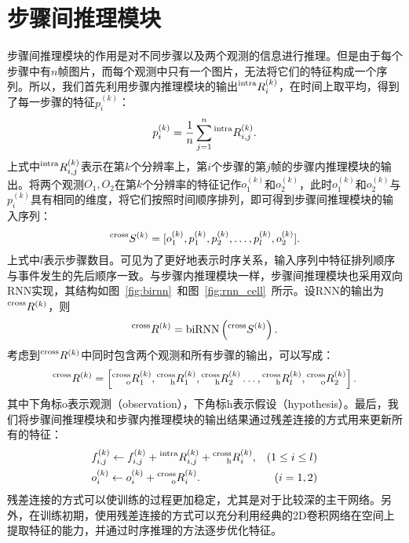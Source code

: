 \section{步骤间推理模块}\label{sec:CSR}
步骤间推理模块的作用是对不同步骤以及两个观测的信息进行推理。但是由于每个步骤中有$n$帧图片，而每个观测中只有一个图片，无法将它们的特征构成一个序列。所以，我们首先利用步骤内推理模块的输出$\prescript{\mathrm{intra}}{}{R}^{(k)}_i$，在时间上取平均，得到了每一步骤的特征$p_i^{(k)}$：
\begin{equation}
    p_i^{(k)} = \frac{1}{n}\sum_{j=1}^n\prescript{\mathrm{intra}}{}{R}^{(k)}_{i,j}.
\end{equation}
上式中$\prescript{\mathrm{intra}}{}{R}^{(k)}_{i,j}$表示在第$k$个分辨率上，第$i$个步骤的第$j$帧的步骤内推理模块的输出。将两个观测$O_1,O_2$在第$k$个分辨率的特征记作$o_1^{(k)}$和$o_2^{(k)}$，此时$o_1^{(k)}$和$o_2^{(k)}$与$p_i^{(k)}$具有相同的维度，将它们按照时间顺序排列，即可得到步骤间推理模块的输入序列：
\begin{equation}
    \prescript{\mathrm{cross}}{}{S}^{(k)} = [o_1^{(k)}, p_1^{(k)}, p_2^{(k)}, \ldots, p_l^{(k)}, o_2^{(k)}].
\end{equation}
上式中$l$表示步骤数目。可见为了更好地表示时序关系，输入序列中特征排列顺序与事件发生的先后顺序一致。与步骤内推理模块一样，步骤间推理模块也采用双向RNN实现，其结构如图~\ref{fig:birnn}~和图~\ref{fig:rnn_cell}~所示。设RNN的输出为$\prescript{\mathrm{cross}}{}{R}^{(k)}$，则
\begin{equation}
    \prescript{\mathrm{cross}}{}{R}^{(k)} = \operatorname{biRNN}\left(\prescript{\mathrm{cross}}{}{S}^{(k)}\right).
\end{equation}
考虑到$\prescript{\mathrm{cross}}{}{R}^{(k)}$中同时包含两个观测和所有步骤的输出，可以写成：
\begin{equation}
    \prescript{\mathrm{cross}}{}{R}^{(k)} = \left[\prescript{\mathrm{cross}}{\rm o}{R}_1^{(k)},\prescript{\mathrm{cross}}{\rm h}{R}_1^{(k)},\prescript{\mathrm{cross}}{\rm h}{R}_2^{(k)}\ldots, \prescript{\mathrm{cross}}{\rm h}{R}_l^{(k)},\prescript{\mathrm{cross}}{\rm o}{R}_2^{(k)}\right].
\end{equation}
其中下角标$\mathrm{o}$表示观测（observation），下角标$\mathrm{h}$表示假设（hypothesis）。最后，我们将步骤间推理模块和步骤内推理模块的输出结果通过残差连接\cite{he2016deep}的方式用来更新所有的特征：
\begin{equation}
    \begin{aligned}
        &f_{i, j}^{(k)}\leftarrow f_{i, j}^{(k)} + \prescript{\mathrm{intra}}{}{R}_{i, j}^{(k)}  +\prescript{\mathrm{cross}}{\rm h}{R}_i^{(k)}, &(1\le i \le l)\\
        &o_{i}^{(k)} \leftarrow o_{i}^{(k)} + \prescript{\mathrm{cross}}{\rm o}{R}_i^{(k)}. &(i = 1, 2)
    \end{aligned}
\end{equation}
残差连接的方式可以使训练的过程更加稳定，尤其是对于比较深的主干网络。另外，在训练初期，使用残差连接的方式可以充分利用经典的2D卷积网络在空间上提取特征的能力，并通过时序推理的方法逐步优化特征。

